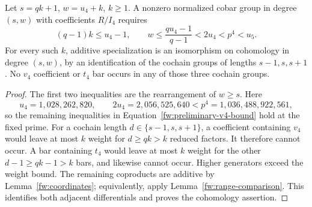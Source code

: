 \begin{lemma}
\label{fw:additive-comparison}
Let $s=qk+1$, $w=u_4+k$, $k\geq1$.  A nonzero normalized cobar group
in degree $(s,w)$ with coefficients $R/I_4$ requires
\begin{equation}
 (q-1)k\leq u_4-1,\qquad
 w\leq\frac{qu_4-1}{q-1}<2u_4<p^4<u_5.
 \label{fw:preliminary-v4-bound}
\end{equation}
For every such $k$, additive specialization is an isomorphism on
cohomology in degree $(s,w)$, by an identification of the cochain groups
of lengths $s-1,s,s+1$.  No $v_4$ coefficient or $t_4$ bar occurs in
any of those three cochain groups.
\end{lemma}

\begin{proof}
The first two inequalities are the rearrangement of $w\geq s$.
Here
\[
 u_4=1{,}028{,}262{,}820,\qquad
 2u_4=2{,}056{,}525{,}640<p^4=1{,}036{,}488{,}922{,}561,
\]
so the remaining inequalities in
Equation~\eqref{fw:preliminary-v4-bound} hold at the fixed prime.
For a cochain length $d\in\{s-1,s,s+1\}$, a coefficient containing
$v_4$ would leave at most $k$ weight for $d\geq qk>k$ reduced factors.
It therefore cannot occur.  A bar containing $t_4$ would leave at most
$k$ weight for the other $d-1\geq qk-1>k$ bars, and likewise cannot occur.
Higher generators exceed the weight bound.  The remaining coproducts
are additive by Lemma~\ref{fw:coordinates}; equivalently, apply
Lemma~\ref{fw:range-comparison}.  This identifies both adjacent
differentials and proves the cohomology assertion.
\end{proof}
